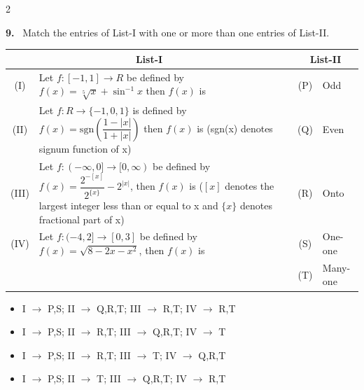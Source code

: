 \documentclass[10pt]{extarticle}
\newcommand{\qn}[1]{\par\smallskip\noindent\textbf{#1.}~}
\newenvironment{qoptions}{\begin{itemize}[leftmargin=1.8em,itemsep=1pt,topsep=2pt,label={}]}{\end{itemize}}
\newcommand{\opt}[2]{\item[(#1)] #2}
\begin{document}
\begin{multicols}{2}
\qn{9} Match the entries of List-I with one or more than one entries of List-II.\par\nobreak
\begin{center}\small\setlength{\tabcolsep}{3pt}
\begin{tabular}{|c|p{4.5cm}|c|p{1.2cm}|}
\hline
\multicolumn{2}{|c|}{\textbf{List-I}} & \multicolumn{2}{c|}{\textbf{List-II}} \\
\hline
(I) & Let $f:[-1,1]\to R$ be defined by $f(x)=\sqrt[5]x+\sin^{-1}x$ then $f(x)$ is & (P) & Odd \\
\hline
(II) & Let $f:R\to\{-1,0,1\}$ is defined by $f(x)=\text{sgn}\left(\dfrac{1-|x|}{1+|x|}\right)$ then $f(x)$ is (sgn(x) denotes signum function of x) & (Q) & Even \\
\hline
(III) & Let $f:(-\infty,0]\to[0,\infty)$ be defined by $f(x)=\dfrac{2^{-[x]}}{2^{\{x\}}}-2^{|x|}$, then $f(x)$ is ($[x]$ denotes the largest integer less than or equal to x and $\{x\}$ denotes fractional part of x) & (R) & Onto \\
\hline
(IV) & Let $f:(-4,2]\to[0,3]$ be defined by $f(x)=\sqrt{8-2x-x^2}$, then $f(x)$ is & (S) & One-one \\
\hline
 & & (T) & Many-one \\
\hline
\end{tabular}
\end{center}
\begin{qoptions}
\opt{A}{I $\to$ P,S; II $\to$ Q,R,T; III $\to$ R,T; IV $\to$ R,T}
\opt{B}{I $\to$ P,S; II $\to$ R,T; III $\to$ Q,R,T; IV $\to$ T}
\opt{C}{I $\to$ P,S; II $\to$ R,T; III $\to$ T; IV $\to$ Q,R,T}
\opt{D}{I $\to$ P,S; II $\to$ T; III $\to$ Q,R,T; IV $\to$ R,T}
\end{qoptions}


\end{multicols}
\end{document}
